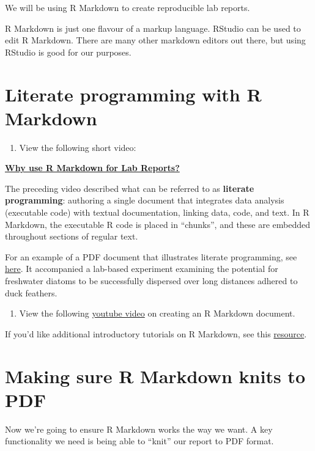 \documentclass[
]{book}
\providecommand{\tightlist}{%
  \setlength{\itemsep}{0pt}\setlength{\parskip}{0pt}}
\begin{document}
We will be using R Markdown to create reproducible lab reports.

R Markdown is just one flavour of a markup language. RStudio can be used to edit R Markdown. There are many other markdown editors out there, but using RStudio is good for our purposes.

\section{Literate programming with R Markdown}\label{lit_programming}

\begin{enumerate}
\def\labelenumi{\arabic{enumi}.}
\tightlist
\item
  View the following short video:
\end{enumerate}

\href{https://youtu.be/lNWVQ2oxNho}{\textbf{Why use R Markdown for Lab Reports?}}

The preceding video described what can be referred to as \textbf{literate programming}: authoring a single document that integrates data analysis (executable code) with textual documentation, linking data, code, and text. In R Markdown, the executable R code is placed in ``chunks'', and these are embedded throughout sections of regular text.

For an example of a PDF document that illustrates literate programming, see \href{https://osf.io/59j4b}{here}. It accompanied a lab-based experiment examining the potential for freshwater diatoms to be successfully dispersed over long distances adhered to duck feathers.

\begin{enumerate}
\def\labelenumi{\arabic{enumi}.}
\setcounter{enumi}{1}
\tightlist
\item
  View the following \href{https://www.youtube.com/watch?v=asHhuHRxhvo}{youtube video} on creating an R Markdown document.
\end{enumerate}

If you'd like additional introductory tutorials on R Markdown, see this \href{https://rbasics.netlify.app/4-rmarkdown.html}{resource}.

\section{Making sure R Markdown knits to PDF}\label{veryify_knit}

Now we're going to ensure R Markdown works the way we want. A key functionality we need is being able to ``knit'' our report to PDF format.
\end{document}
